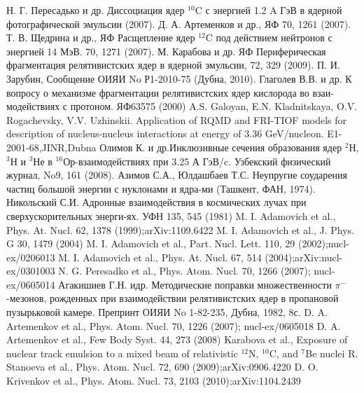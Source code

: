 \documentclass[fontsize=14pt]{scrreport}
\begin{document}
\begin{thebibliography}{57}
 {Н. Г. Пересадько и др. Диссоциация ядер $^{10}$C с энергией 1.2 A ГэВ в ядерной фотографической эмульсии (2007).}
 {Д. А. Артеменков и др., ЯФ 70, 1261 (2007).}
 {Т. В. Щедрина и др., ЯФ Расщепление ядер $^{12}$C под действием нейтронов с энергией 14 МэВ. 70, 1271 (2007).}
 {М. Карабова и др. ЯФ Периферическая фрагментация релятивистских ядер  в ядерной эмульсии, 72, 329 (2009).}
 {П. И. Зарубин, Сообщение ОИЯИ No Р1-2010-75 (Дубна, 2010).}
 {Глаголев В.В. и др. К вопросу о механизме фрагментации релятивистских ядер кислорода во взаи-модействиях с протоном. ЯФ63575 (2000)}
 {A.S.  Galoyan,  E.N.  Kladnitskaya,  O.V.  Rogachevsky,  V.V.  Uzhinskii. Application  of  RQMD  and  FRI-TIOF  models  for  description  of  nucleus-nucleus  interactions  at  energy  of  3.36  GeV/nucleon.  E1-2001-68,JINR,Dubna}
 {Олимов К. и др.Инклюзивные сечения образования ядер $^{2}$Н, $^{3}$Н и $^{3}$Не в $^{16}$Ор-взаимодействиях при 3.25 А ГэВ/c. Узбекский физический журнал, No9, 161 (2008).}
 {Азимов С.А., Юлдашбаев Т.С. Неупругие соударения частиц большой энергии с нуклонами и ядра-ми (Ташкент, ФАН, 1974).}
 {Никольский С.И. Адронные взаимодействия в космических лучах при сверхускорительных энерги-ях. УФН 135, 545 (1981)}
 {M. I. Adamovich et al., Phys. At. Nucl. 62, 1378 (1999);arXiv:1109.6422}
 {M. I. Adamovich et al., J. Phys. G 30, 1479 (2004)}
 {M. I. Adamovich et al., Part. Nucl. Lett. 110, 29 (2002);nucl-ex/0206013}
 {M. I. Adamovich et al., Phys. At. Nucl. 67, 514 (2004);arXiv:nucl-ex/0301003}
 {N. G. Peresadko et al., Phys. Atom. Nucl. 70, 1266 (2007); nucl-ex/0605014}
 {Агакишиев Г.Н. идр. Методические поправки множественности $\pi^{-}$-мезонов, рожденных при взаимодействии  релятивистских  ядер  в пропановой  пузырьковой  камере. Препринт  ОИЯИ  No  1-82-235, Дубна, 1982, 8с.}
 {D. A. Artemenkov et al., Phys. Atom. Nucl. 70, 1226 (2007); nucl-ex/0605018}
 {D. A. Artemenkov et al., Few Body Syst. 44, 273 (2008)}
 {Karabova et al., Exposure of nuclear track emulsion to a mixed beam of relativistic $^{12}$N, $^{10}$C, and $^{7}$Be nuclei}
 {R. Stanoeva et al., Phys. Atom. Nucl. 72, 690 (2009);arXiv:0906.4220}
 {D. O. Krivenkov et al., Phys. Atom. Nucl. 73, 2103 (2010);arXiv:1104.2439}

\end{thebibliography}
\end{document}

